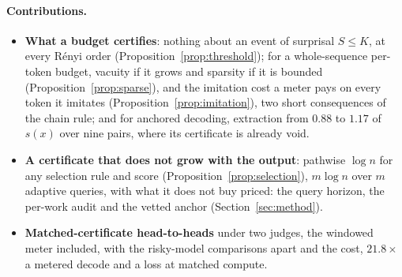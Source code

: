 \paragraph{Contributions.}
\begin{itemize}[leftmargin=1.2em,itemsep=1pt,topsep=2pt,parsep=0pt]
\item \textbf{What a budget certifies}: nothing about an event of surprisal $S \le K$, at every R\'enyi order
(Proposition~\ref{prop:threshold}); for a whole-sequence per-token budget, vacuity if it grows and sparsity
if it is bounded (Proposition~\ref{prop:sparse}), and the imitation cost a meter pays on every token it imitates
(Proposition~\ref{prop:imitation}), two short consequences of the chain rule; and for anchored decoding,
extraction from $0.88$ to $1.17$ of $s(x)$ over nine pairs, where its certificate is already void.
\item \textbf{A certificate that does not grow with the output}: pathwise $\log n$ for any selection
rule and score (Proposition~\ref{prop:selection}), $m\log n$ over $m$ adaptive queries, with what it does not
buy priced: the query horizon, the per-work audit and the vetted anchor (Section~\ref{sec:method}).
\item \textbf{Matched-certificate head-to-heads} under two judges, the windowed meter included,
with the risky-model comparisons apart and the cost, $21.8\times$ a metered decode and a loss
at matched compute.
\end{itemize}

